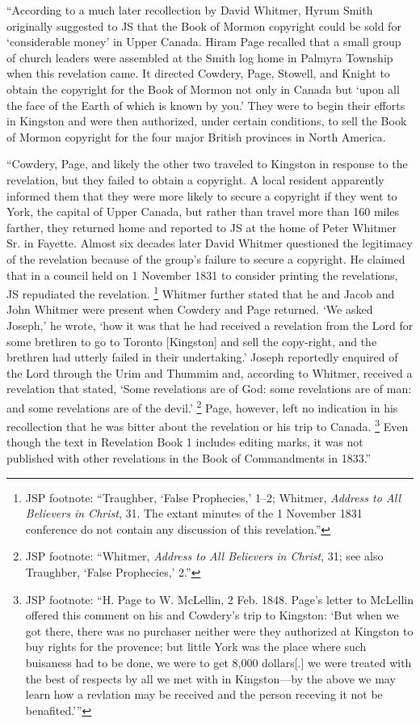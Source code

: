				``According to a much later recollection by David Whitmer, Hyrum Smith originally suggested to JS that the Book of Mormon copyright could be sold for `considerable money' in Upper Canada. Hiram Page recalled that a small group of church leaders were assembled at the Smith log home in Palmyra Township when this revelation came. It directed Cowdery, Page, Stowell, and Knight to obtain the copyright for the Book of Mormon not only in Canada but `upon all the face of the Earth of which is known by you.' They were to begin their efforts in Kingston and were then authorized, under certain conditions, to sell the Book of Mormon copyright for the four major British provinces in North America.
				
				``Cowdery, Page, and likely the other two traveled to Kingston in response to the revelation, but they failed to obtain a copyright. A local resident apparently informed them that they were more likely to secure a copyright if they went to York, the capital of Upper Canada, but rather than travel more than 160 miles farther, they returned home and reported to JS at the home of Peter Whitmer Sr. in Fayette. Almost six decades later David Whitmer questioned the legitimacy of the revelation because of the group's failure to secure a copyright. He claimed that in a council held on 1 November 1831 to consider printing the revelations, JS repudiated the revelation.%
					\footnote{%
						JSP footnote: ``Traughber, `False Prophecies,' 1--2; Whitmer, \textit{Address to All Believers in Christ}, 31. The extant minutes of the 1 November 1831 conference do not contain any discussion of this revelation.''
						}
				Whitmer further stated that he and Jacob and John Whitmer were present when Cowdery and Page returned. `We asked Joseph,' he wrote, `how it was that he had received a revelation from the Lord for some brethren to go to Toronto [Kingston] and sell the copy-right, and the brethren had utterly failed in their undertaking.' Joseph reportedly enquired of the Lord through the Urim and Thummim and, according to Whitmer, received a revelation that stated, `Some revelations are of God: some revelations are of man: and some revelations are of the devil.'%
					\footnote{%
						JSP footnote: ``Whitmer, \textit{Address to All Believers in Christ}, 31; see also Traughber, `False Prophecies,' 2.''
						}
				Page, however, left no indication in his recollection that he was bitter about the revelation or his trip to Canada.%
					\footnote{%
						JSP footnote: ``H. Page to W. McLellin, 2 Feb. 1848. Page's letter to McLellin offered this comment on his and Cowdery’s trip to Kingston: `But when we got there, there was no purchaser neither were they authorized at Kingston to buy rights for the provence; but little York was the place where such buisaness had to be done, we were to get 8,000 dollars[.] we were treated with the best of respects by all we met with in Kingston---by the above we may learn how a revlation may be received and the person receving it not be benafited.'''
						}
				Even though the text in Revelation Book 1 includes editing marks, it was not published with other revelations in the Book of Commandments in 1833.''
			
